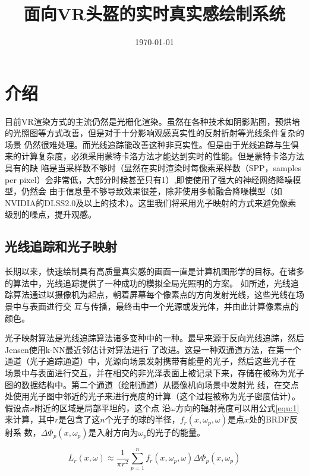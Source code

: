 \documentclass[UTF8]{ctexart}
\title{面向VR头盔的实时真实感绘制系统}
\author{}
\date{\today}
\begin{document}
\maketitle
\begin{abstract}
\end{abstract}

\section{介绍}
    目前VR渲染方式的主流仍然是光栅化渲染。虽然在各种技术如阴影贴图，预烘培的光照图等方式改善，但是对于十分影响观感真实性的反射折射等光线条件复杂的场景
    仍然很难处理。而光线追踪能改善这种非真实性。但是由于光线追踪与生俱来的计算复杂度，必须采用蒙特卡洛方法才能达到实时的性能。但是蒙特卡洛方法具有的缺
    陷是当采样数不够时（显然在实时渲染时每像素采样数（SPP，samples per pixel）会非常低，大部分时候甚至只有1）,即使使用了强大的神经网络降噪模型，仍然会
    由于信息量不够导致效果很差，除非使用多帧融合降噪模型（如NVIDIA的DLSS2.0及以上的技术）。这里我们将采用光子映射的方式来避免像素级别的噪点，提升观感。
    \subsection{光线追踪和光子映射}
        长期以来，快速绘制具有高质量真实感的画面一直是计算机图形学的目标。在诸多的算法中，光线追踪提供了一种成功的模拟全局光照明的方案。
        如\cite{GlobalIllumination}所述，光线追踪算法通过以摄像机为起点，朝着屏幕每个像素点的方向发射光线，这些光线在场景中与表面进行交
        互与传播，最终击中一个光源或发光体，并由此计算像素点的颜色。
        
        光子映射算法是光线追踪算法诸多变种中的一种。最早来源于反向光线追踪\cite{ARVO1986Backward}，然后Jensen使用k-NN最近邻估计对算法进行
        了改进\cite{Jensen1996Global}。这是一种双通道方法，在第一个通道（光子追踪通道）中，光源向场景发射携带有能量的光子，然后这些光子在
        场景中与表面进行交互，并在相交的非光泽表面上被记录下来，存储在被称为光子图的数据结构中。第二个通道（绘制通道）从摄像机向场景中发射光
        线，在交点处使用光子图中邻近的光子来进行亮度的计算（这个过程被称为光子密度估计）。假设点$x$附近的区域是局部平坦的，这个点
        沿$\omega$方向的辐射亮度可以用公式\ref{equ:1}来计算，其中$r$是包含了这$n$个光子的球的半径，$f_r(x,\omega_p,\omega)$是点$x$处的BRDF反射系
        数，$\Delta\Phi_p(x,\omega_p)$是入射方向为$\omega_p$的光子的能量。
        
        \begin{equation}
        L_r(x,\omega)\approx\frac{1}{\pi r^2}\sum_{p=1}^nf_r(x,\omega_p,\omega)\Delta\Phi_p(x,\omega_p)
        \label{equ:1}
        \end{equation}
\end{document}
